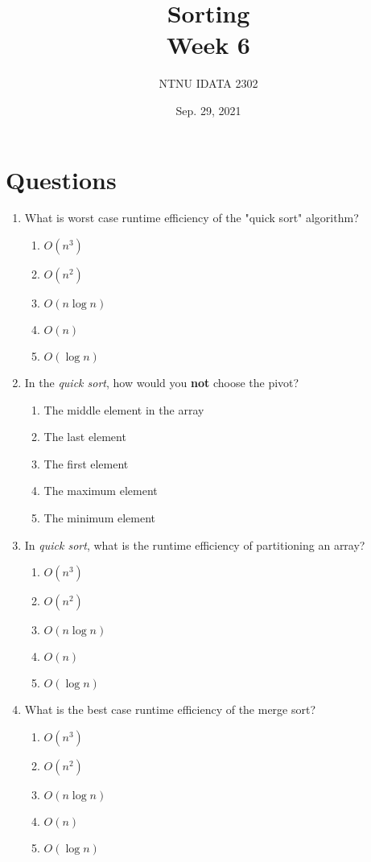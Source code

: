 \documentclass[11pt]{article}
\author{NTNU IDATA 2302}
\date{Sep. 29, 2021}
\title{Sorting\\\medskip
\large Week 6}
\begin{document}
\maketitle


\section{Questions}
\label{sec:org63a206b}


\begin{enumerate}
\item What is worst case runtime efficiency of the "quick sort"
algorithm?
\begin{enumerate}
\item \(O(n^3)\)
\item \(O(n^2)\)
\item \(O(n \log n)\)
\item \(O(n)\)
\item \(O(\log n)\)
\end{enumerate}

\item In the \emph{quick sort}, how would you \textbf{not} choose the pivot?
\begin{enumerate}
\item The middle element in the array
\item The last element
\item The first element
\item The maximum element
\item The minimum element
\end{enumerate}

\item In \emph{quick sort}, what is the runtime efficiency of partitioning an
array?
\begin{enumerate}
\item \(O(n^3)\)
\item \(O(n^2)\)
\item \(O(n \log n)\)
\item \(O(n)\)
\item \(O(\log n)\)
\end{enumerate}

\item What is the best case runtime efficiency of the merge sort?
\begin{enumerate}
\item \(O(n^3)\)
\item \(O(n^2)\)
\item \(O(n \log n)\)
\item \(O(n)\)
\item \(O(\log n)\)
\end{enumerate}


\end{enumerate}
\end{document}
